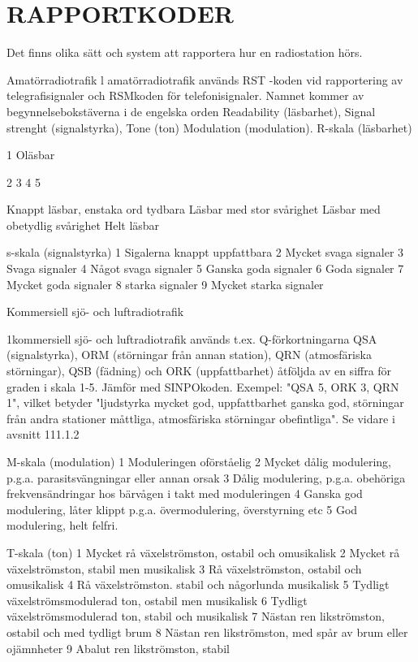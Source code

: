 \chapter{RAPPORTKODER}
Det finns olika sätt och system att rapportera hur en radiostation hörs.

Amatörradiotrafik
l amatörradiotrafik används RST -koden vid
rapportering av telegrafisignaler och RSMkoden för telefonisignaler. Namnet kommer
av begynnelsebokstäverna i de engelska
orden
Readability
(läsbarhet),
Signal strenght
(signalstyrka),
Tone
(ton)
Modulation
(modulation).
R-skala (läsbarhet)

1 Oläsbar

2
3
4
5

Knappt läsbar, enstaka ord tydbara
Läsbar med stor svårighet
Läsbar med obetydlig svårighet
Helt läsbar

s-skala (signalstyrka)
1 Sigalerna knappt uppfattbara
2 Mycket svaga signaler
3 Svaga signaler
4 Något svaga signaler
5 Ganska goda signaler
6 Goda signaler
7 Mycket goda signaler
8 starka signaler
9 Mycket starka signaler

Kommersiell sjö- och luftradiotrafik

1kommersiell sjö- och luftradiotrafik används
t.ex. Q-förkortningarna QSA (signalstyrka),
ORM (störningar från annan station), QRN
(atmosfäriska störningar), QSB (fädning) och
ORK (uppfattbarhet) åtföljda av en siffra för
graden i skala 1-5. Jämför med SINPOkoden.
Exempel:
"QSA 5, ORK 3, QRN 1", vilket betyder
"ljudstyrka mycket god, uppfattbarhet ganska god, störningar från andra stationer
måttliga, atmosfäriska störningar obefintliga".
Se vidare i avsnitt 111.1.2

M-skala (modulation)
1 Moduleringen oförståelig
2 Mycket dålig modulering, p.g.a.
parasitsvängningar eller annan orsak
3 Dålig modulering, p.g.a. obehöriga
frekvensändringar hos bärvågen i takt
med moduleringen
4 Ganska god modulering, låter klippt
p.g.a. övermodulering, överstyrning
etc
5 God modulering, helt felfri.

T-skala (ton)
1 Mycket rå växelströmston, ostabil och omusikalisk
2 Mycket rå växelströmston, stabil men musikalisk
3 Rå växelströmston, ostabil och omusikalisk
4 Rå växelströmston. stabil och någorlunda musikalisk
5 Tydligt växelströmsmodulerad ton, ostabil men musikalisk
6 Tydligt växelströmsmodulerad ton, stabil och musikalisk
7 Nästan ren likströmston, ostabil och med tydligt brum
8 Nästan ren likströmston, med spår av brum eller ojämnheter
9 Abalut ren likströmston, stabil

